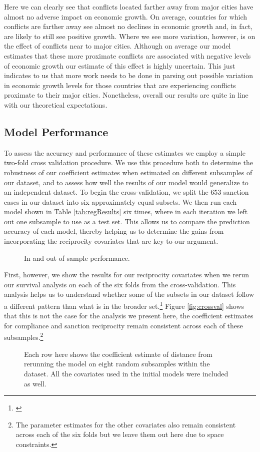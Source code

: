 Here we can clearly see that conflicts located farther away from major cities have almost no adverse impact on economic growth. On average, countries for which conflicts are farther away see almost no declines in economic growth and, in fact, are likely to still see positive growth. Where we see more variation, however, is on the effect of conflicts near to major cities. Although on average our model estimates that these more proximate conflicts are associated with negative levels of economic growth our estimate of this effect is highly uncertain. This just indicates to us that more work needs to be done in parsing out possible variation in economic growth levels for those countries that are experiencing conflicts proximate to their major cities. Nonetheless, overall our results are quite in line with our theoretical expectations.

\subsection{Model Performance}

To assess the accuracy and performance of these estimates we employ a simple two-fold cross validation procedure. We use this procedure both to determine the robustness of our coefficient estimates when estimated on different subsamples of our dataset, and to assess how well the results of our model would generalize to an independent dataset. To begin the cross-validation, we split the 653 sanction cases in our dataset into six approximately equal subsets. We then run each model shown in Table \ref{tab:regResults} six times, where in each iteration we left out one subsample to use as a test set. This allows us to compare the prediction accuracy of each model, thereby helping us to determine the gains from incorporating the reciprocity covariates that are key to our argument.

\begin{figure}
	\centering
	\resizebox{.8\textwidth}{!}{}
	\caption{In and out of sample performance.}
	\label{fig:rmsePlot}
\end{figure}

First, however, we show the results for our reciprocity covariates when we rerun our survival analysis on each of the six folds from the cross-validation. This analysis helps us to understand whether some of the subsets in our dataset follow a different pattern than what is in the broader set.\footnote{\cite{beck2008time}} Figure \ref{fig:crossval} shows that this is not the case for the analysis we present here, the coefficient estimates for compliance and sanction reciprocity remain consistent across each of these subsamples.\footnote{The parameter estimates for the other covariates also remain consistent across each of the six folds but we leave them out here due to space constraints.}

\begin{figure}
	\centering
	\resizebox{.8\textwidth}{!}{}
	\caption{Each row here shows the coefficient estimate of distance from rerunning the model on eight random subsamples within the dataset. All the covariates used in the initial models were included as well.}
	\label{fig:crossPlot}
\end{figure}